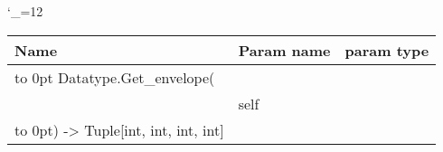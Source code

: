 \begingroup \catcode`\_=12 \tt
\begin{tabular}{lll}
\toprule
\textrm{Name}&\textrm{Param name}&\textrm{param type}\\
\midrule
\hbox to 0pt {Datatype.Get_envelope(\hss}\\
& self\\
\hbox to 0pt{) -> Tuple[int, int, int, int]\hss}\\
\bottomrule
\end{tabular}
\endgroup

